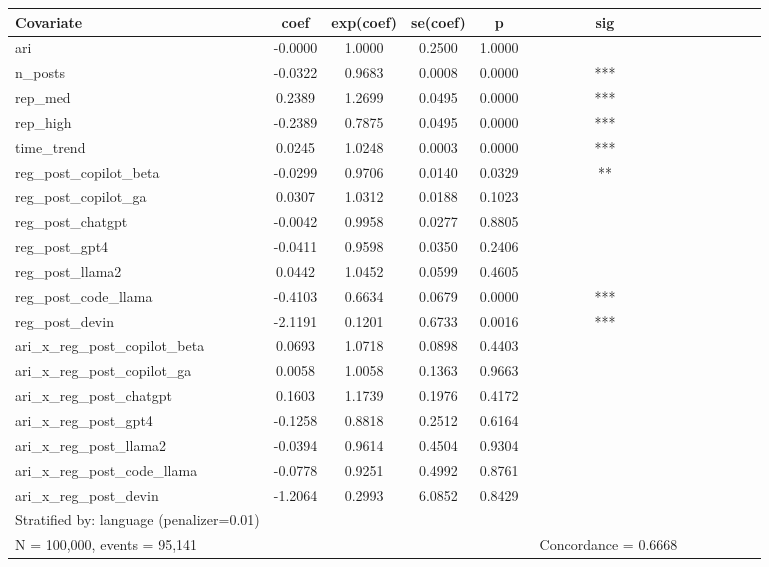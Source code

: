 \begin{tabular}{lccccc}
\toprule
Covariate & coef & exp(coef) & se(coef) & p & sig \\
\midrule
ari & -0.0000 & 1.0000 & 0.2500 & 1.0000 &  \\
n_posts & -0.0322 & 0.9683 & 0.0008 & 0.0000 & *** \\
rep_med & 0.2389 & 1.2699 & 0.0495 & 0.0000 & *** \\
rep_high & -0.2389 & 0.7875 & 0.0495 & 0.0000 & *** \\
time_trend & 0.0245 & 1.0248 & 0.0003 & 0.0000 & *** \\
reg_post_copilot_beta & -0.0299 & 0.9706 & 0.0140 & 0.0329 & ** \\
reg_post_copilot_ga & 0.0307 & 1.0312 & 0.0188 & 0.1023 &  \\
reg_post_chatgpt & -0.0042 & 0.9958 & 0.0277 & 0.8805 &  \\
reg_post_gpt4 & -0.0411 & 0.9598 & 0.0350 & 0.2406 &  \\
reg_post_llama2 & 0.0442 & 1.0452 & 0.0599 & 0.4605 &  \\
reg_post_code_llama & -0.4103 & 0.6634 & 0.0679 & 0.0000 & *** \\
reg_post_devin & -2.1191 & 0.1201 & 0.6733 & 0.0016 & *** \\
ari_x_reg_post_copilot_beta & 0.0693 & 1.0718 & 0.0898 & 0.4403 &  \\
ari_x_reg_post_copilot_ga & 0.0058 & 1.0058 & 0.1363 & 0.9663 &  \\
ari_x_reg_post_chatgpt & 0.1603 & 1.1739 & 0.1976 & 0.4172 &  \\
ari_x_reg_post_gpt4 & -0.1258 & 0.8818 & 0.2512 & 0.6164 &  \\
ari_x_reg_post_llama2 & -0.0394 & 0.9614 & 0.4504 & 0.9304 &  \\
ari_x_reg_post_code_llama & -0.0778 & 0.9251 & 0.4992 & 0.8761 &  \\
ari_x_reg_post_devin & -1.2064 & 0.2993 & 6.0852 & 0.8429 &  \\
\midrule
Stratified by: language (penalizer=0.01) & & & & & \\
N = 100,000, events = 95,141 & & & & & \
Concordance = 0.6668 & & & & & \
\bottomrule
\end{tabular}